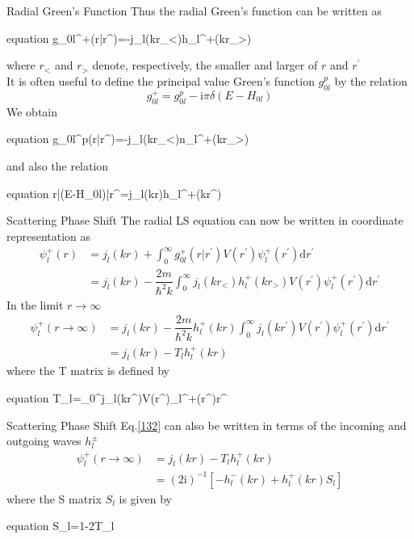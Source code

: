 \documentclass{beamer}
\begin{document}
	\begin{frame}{Radial Green's Function}
		Thus the radial Green's function can be written as
		\begin{empheq}[box=\fbox]{equation}
			g_{0l}^+(r|r^\prime)=-j_l(kr_<)h_l^+(kr_>)
		\end{empheq}
		where $r_<$ and $r_>$ denote, respectively, the smaller and larger of $r$ and $r^\prime$\\
		It is often useful to define the principal value Green's function $g_{0l}^p$ by the relation
		\begin{equation}
			g_{0l}^+=g_{0l}^p-\mathrm{i}\pi\delta(E-H_{0l})
		\end{equation}
		We obtain
		\begin{empheq}[box=\fbox]{equation}
			g_{0l}^p(r|r^\prime)=-j_l(kr_<)n_l^+(kr_>)
		\end{empheq}
		and also the relation
		\begin{empheq}[box=\fbox]{equation}
			\langle r|\delta(E-H_{0l})|r^\prime\rangle=j_l(kr)h_l^+(kr^\prime)
		\end{empheq}
	\end{frame}
	\begin{frame}{Scattering Phase Shift}
		The radial LS equation can now be written in coordinate representation as
		\begin{align}
			\psi_l^+(r)&=j_l(kr)+\int_0^\infty g_{0l}^+(r|r^\prime)V(r^\prime)\psi_l^+(r^\prime)\mathrm{d}r^\prime\nonumber\\
			&=j_l(kr)-\dfrac{2m}{\hbar^2k}\int_0^\infty j_l(kr_<)h_l^+(kr_>)V(r^\prime)\psi_l^+(r^\prime)\mathrm{d}r^\prime
		\end{align}
		In the limit $r\rightarrow\infty$
		\begin{align}
			\psi_l^+(r\rightarrow\infty)&=j_l(kr)-\dfrac{2m}{\hbar^2k}h_l^+(kr)\int_0^\infty j_l(kr^\prime	)V(r^\prime)\psi_l^+(r^\prime)\mathrm{d}r^\prime\nonumber\\
			&=j_l(kr)-T_lh_l^+(kr)
			\label{132}
		\end{align}
		where the T matrix is defined by
		\begin{empheq}[box=\fbox]{equation}
			T_l=\int_0^\infty j_l(kr^\prime	)V(r^\prime)\psi_l^+(r^\prime)r^\prime
		\end{empheq}
	\end{frame}
	\begin{frame}{Scattering Phase Shift}
		Eq.\eqref{132} can also be written in terms of the incoming and outgoing waves $h_l^\pm$
		\begin{align}
			\psi_l^+(r\rightarrow\infty)&=j_l(kr)-T_lh_l^+(kr)\nonumber\\
			&=(2\mathrm{i})^{-1}\left[ -h_l^-(kr)+h_l^+(kr)S_l\right] 
		\end{align}
		where the S matrix $S_l$ is given by
		\begin{empheq}[box=\fbox]{equation}
			S_l=1-2T_l
		\end{empheq}
	\end{frame}
\end{document}
